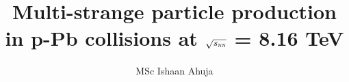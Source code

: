 \documentclass[thesismargins, english, thesislinespacing, oneside, openright, upjsfrontpage,showhonesty]{rnthesis}
\title{Multi-strange particle production in p-Pb collisions at $\sqrt{s_{\textnormal{\sc nn}}}$ = 8.16 TeV}
\author{MSc Ishaan Ahuja}
\begin{document}
\maketitle
\newpage
{\small\tableofcontents}
\listoffigures
\listoftables










\end{document}
